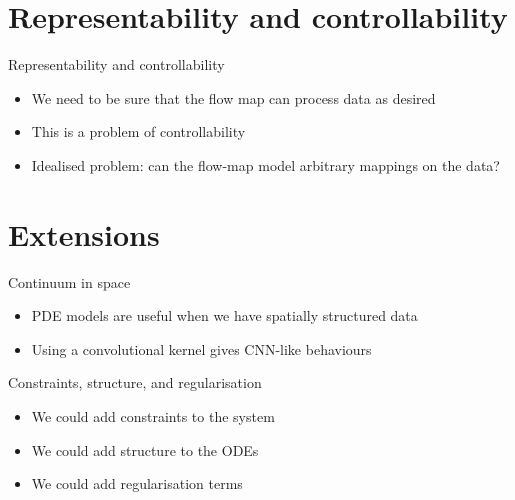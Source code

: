 \documentclass[presentation]{beamer}
\begin{document}
\section{Representability and controllability}
\label{sec:orgc89a5d0}
\begin{frame}[label={sec:org9b3d5bf}]{Representability and controllability}
\begin{itemize}
\item We need to be sure that the flow map can process data as desired
\end{itemize}
\vfill
\begin{itemize}
\item This is a problem of controllability
\end{itemize}
\vfill
\begin{itemize}
\item Idealised problem: can the flow-map model arbitrary mappings on the data?
\end{itemize}
\end{frame}

\section{Extensions}
\label{sec:orgac5e824}
\begin{frame}[label={sec:orgf79dd24}]{Continuum in space}
\begin{itemize}
\item PDE models are useful when we have spatially structured data
\end{itemize}
\vfill
\begin{itemize}
\item Using a convolutional kernel gives CNN-like behaviours
\end{itemize}
\end{frame}


\begin{frame}[label={sec:orgce2b76e}]{Constraints, structure, and regularisation}
\begin{itemize}
\item We could add constraints to the system
\end{itemize}
\vfill
\begin{itemize}
\item We could add structure to the ODEs
\end{itemize}
\vfill
\begin{itemize}
\item We could add regularisation terms
\end{itemize}
\end{frame}
\end{document}
